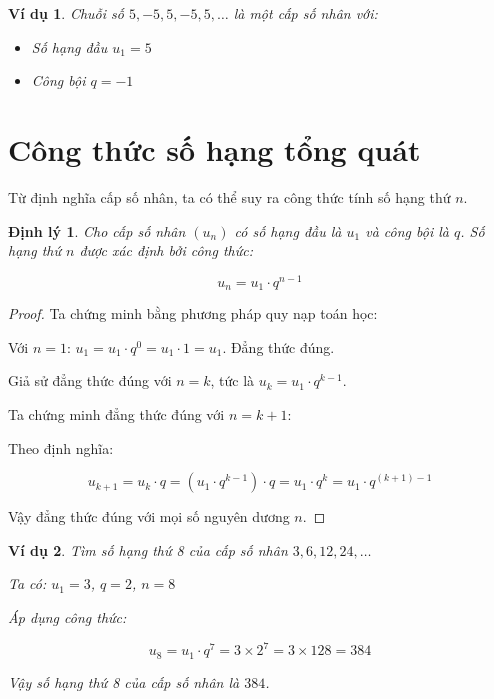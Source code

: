 \documentclass[12pt,a4paper]{report}
\newtheorem{theorem}{Định lý}[section]
\newtheorem{example}{Ví dụ}[section]
\begin{document}
\begin{example}
    Chuỗi số $5, -5, 5, -5, 5, \dots$ là một cấp số nhân với:
    
    \begin{itemize}[label=\textbullet]
        \item Số hạng đầu $u_1 = 5$
        \item Công bội $q = -1$
    \end{itemize}
\end{example}

\section{Công thức số hạng tổng quát}

Từ định nghĩa cấp số nhân, ta có thể suy ra công thức tính số hạng thứ $n$.

\begin{theorem}
    Cho cấp số nhân $(u_n)$ có số hạng đầu là $u_1$ và công bội là $q$. Số hạng thứ $n$ được xác định bởi công thức:
    
    \[
        u_n = u_1 \cdot q^{n-1}
    \]
\end{theorem}

\begin{proof}
    Ta chứng minh bằng phương pháp quy nạp toán học:
    
    Với $n = 1$:
    $u_1 = u_1 \cdot q^0 = u_1 \cdot 1 = u_1$.
    Đẳng thức đúng.
    
    Giả sử đẳng thức đúng với $n = k$, tức là
    $u_k = u_1 \cdot q^{k-1}$.
    
    Ta chứng minh đẳng thức đúng với $n = k + 1$:
    
    Theo định nghĩa:
    
    \[
        u_{k+1}
        = u_k \cdot q
        = (u_1 \cdot q^{k-1}) \cdot q
        = u_1 \cdot q^k
        = u_1 \cdot q^{(k+1)-1}
    \]
    
    Vậy đẳng thức đúng với mọi số nguyên dương $n$.
\end{proof}

\begin{example}
    Tìm số hạng thứ 8 của cấp số nhân $3, 6, 12, 24, \dots$
    
    Ta có: $u_1 = 3$, $q = 2$, $n = 8$
    
    Áp dụng công thức:
    
    \[
        u_8 = u_1 \cdot q^7
        = 3 \times 2^7
        = 3 \times 128 = 384
    \]
    
    Vậy số hạng thứ 8 của cấp số nhân là $384$.
\end{example}
\end{document}
